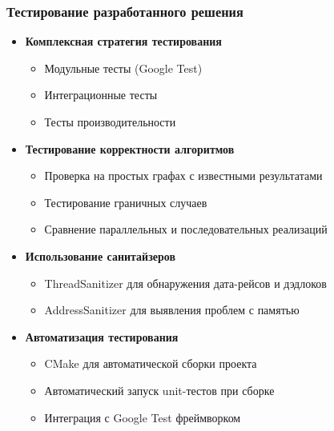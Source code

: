 \documentclass[aspectratio=169]{beamer}
\begin{document}
\begin{frame}
  \frametitle{Тестирование разработанного решения}
  \begin{itemize}
    \item \textbf{Комплексная стратегия тестирования}
      \begin{itemize}
        \item Модульные тесты (Google Test)
        \item Интеграционные тесты
        \item Тесты производительности
      \end{itemize}
    \item \textbf{Тестирование корректности алгоритмов}
      \begin{itemize}
        \item Проверка на простых графах с известными результатами
        \item Тестирование граничных случаев
        \item Сравнение параллельных и последовательных реализаций
      \end{itemize}
    \item \textbf{Использование санитайзеров}
      \begin{itemize}
        \item ThreadSanitizer для обнаружения дата-рейсов и дэдлоков
        \item AddressSanitizer для выявления проблем с памятью
      \end{itemize}
    \item \textbf{Автоматизация тестирования}
      \begin{itemize}
        \item CMake для автоматической сборки проекта
        \item Автоматический запуск unit-тестов при сборке
        \item Интеграция с Google Test фреймворком
      \end{itemize}
  \end{itemize}
\end{frame}

\end{document}
